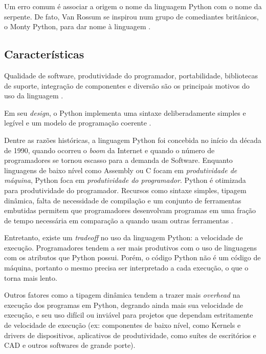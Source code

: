 Um erro comum é associar a origem o nome da linguagem Python com o nome da serpente. De fato, Van Rossum se inspirou num grupo de comediantes britânicos, o Monty Python, para dar nome à linguagem \cite{pythonfaq} . %



\subsection{Características}
Qualidade de software, produtividade do programador, portabilidade, bibliotecas de suporte, integração de componentes e diversão são os principais motivos do uso da linguagem \cite{learningpython}. %

Em seu \emph{design}, o Python implementa uma sintaxe deliberadamente simples e legível e um modelo de programação coerente \cite[p. 50]{learningpython}. 

Dentre as razões históricas, a linguagem Python foi concebida no início da década de 1990, quando ocorreu o \emph{boom} da Internet e quando o número de programadores se tornou escasso para a demanda de Software. Enquanto linguagens de baixo nível como Assembly ou C focam em \emph{produtividade de máquina}, Python foca em \emph{produtividade do programador}. 
Python é otimizada para produtividade do programador. Recursos como sintaxe simples, tipagem dinâmica, falta de necessidade de compilação e um conjunto de ferramentas embutidas permitem que programadores desenvolvam programas em uma fração de tempo necessária em comparação a quando usam outras ferramentas \cite[p. 50]{learningpython}. 

Entretanto, existe um \emph{tradeoff} no uso da linguagem Python: a velocidade de execução. Programadores tendem a ser mais produtivos com o uso de linguagens com os atributos que Python possui. Porém, o código Python não é um código de máquina, portanto o mesmo precisa ser interpretado a cada execução, o que o torna mais lento. 

Outros fatores como a tipagem dinâmica tendem a trazer mais \emph{overhead} na execução dos programas em Python, degrando ainda mais sua velocidade de execução, e seu uso difícil ou inviável para projetos que dependam estritamente de velocidade de execução (ex: componentes de baixo nível, como Kernels e drivers de dispositivos, aplicativos de produtividade, como suítes de escritórios e CAD e outros softwares de grande porte).

